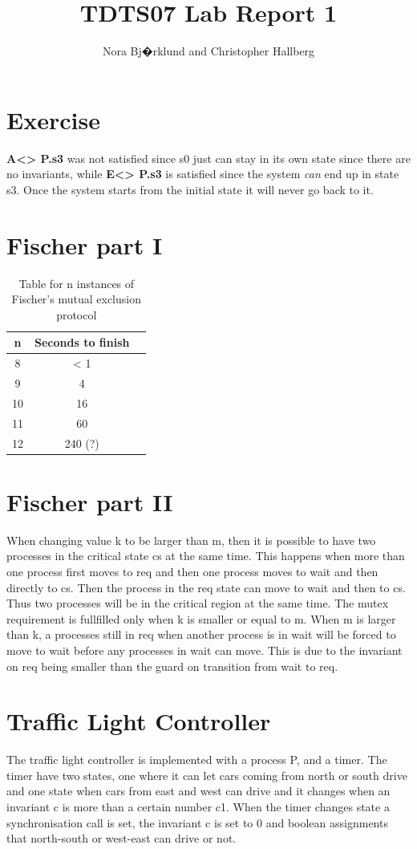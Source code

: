 \documentclass[12pt]{article}
\title{TDTS07 Lab Report 1}
\author{Nora Bj�rklund and Christopher Hallberg}
\begin{document}
\maketitle

\section{Exercise}
\textbf{A<> P.s3} was not satisfied since s0 just can stay in its own state since there are no invariants, while \textbf{E<> P.s3} is satisfied since the system \textit{can} end up in state s3. Once the system starts from the initial state it will never go back to it. 
\section{Fischer part I}
\begin{table}[h]
  \centering
  \begin{tabular}{|c|c|c|}
    \hline
    n  & Seconds to finish \\
    \hline
    8  & < 1 \\
    9  & 4 \\
    10 & 16 \\
    11 & 60 \\
    12 & 240 (?) \\
    \hline
  \end{tabular}
  \caption{Table for n instances of Fischer's mutual exclusion protocol }
  \label{tab:n_fischer}
\end{table}
\section{Fischer part II}
When changing value k to be larger than m, then it is possible to have two processes in the critical state cs at the same time. This happens when more than one process first moves to req and then one process moves to wait and then directly to cs. Then the process in the req state can move to wait and then to cs. Thus two processes will be in the critical region at the same time.
The mutex requirement is fullfilled only when k is smaller or equal to m. When m is larger than k, a processes still in req when another process is in wait will be forced to move to wait before any processes in wait can move. This is due to the invariant on req being smaller than the guard on transition from wait to req.
\section{Traffic Light Controller}
The traffic light controller is implemented with a process P, and a timer. The timer have two states, one where it can let cars coming from north or south drive and one state when cars from east and west can drive and it changes when an invariant c is more than a certain number c1. When the timer changes state a synchronisation call is set, the invariant c is set to 0 and boolean assignments that north-south or west-east can drive or not.
\end{document}
